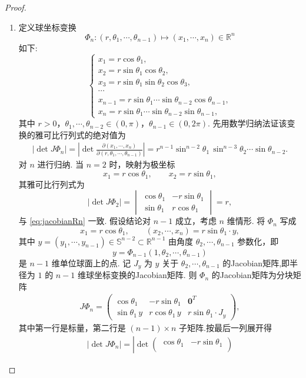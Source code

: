 \documentclass[../../main.tex]{subfiles}%
\begin{document}
\begin{proof}
\begin{enumerate}[(1)]
\item 定义球坐标变换
\[
\Phi_n:(r,\theta_1,\cdots,\theta_{n-1})\mapsto(x_1,\cdots,x_n)\in\mathbb{R}^n
\]
如下:
\[
\begin{cases}
x_1=r\cos\theta_1,\\
x_2=r\sin\theta_1\cos\theta_2,\\
x_3=r\sin\theta_1\sin\theta_2\cos\theta_3,\\
\cdots\\
x_{n-1}=r\sin\theta_1\cdots\sin\theta_{n-2}\cos\theta_{n-1},\\
x_n=r\sin\theta_1\cdots\sin\theta_{n-2}\sin\theta_{n-1},
\end{cases}
\]
其中 $r>0$，$\theta_1,\cdots,\theta_{n-2}\in(0,\pi)$，$\theta_{n-1}\in(0,2\pi)$.
先用数学归纳法证该变换的雅可比行列式的绝对值为
\begin{align}
|\det J\Phi_n|=\left|\det\frac{\partial(x_1,\cdots,x_n)}{\partial(r,\theta_1,\cdots,\theta_{n-1})}\right|
=r^{n-1}\sin^{n-2}\theta_1\,\sin^{n-3}\theta_2\cdots\sin\theta_{n-2}.\label{eq:jacobianRn}
\end{align}
对 $n$ 进行归纳.
当 $n=2$ 时，映射为极坐标
\[
x_1=r\cos\theta_1,\qquad x_2=r\sin\theta_1,
\]
其雅可比行列式为
\[
|\det J\Phi_2|=\begin{vmatrix}
\cos\theta_1 & -r\sin\theta_1\\
\sin\theta_1 & r\cos\theta_1
\end{vmatrix}=r,
\]
与 \eqref{eq:jacobianRn} 一致.
假设结论对 $n-1$ 成立，考虑 $n$ 维情形. 将 $\Phi_n$ 写成
\[
x_1=r\cos\theta_1,\qquad (x_2,\cdots,x_n)=r\sin\theta_1\cdot y,
\]
其中 $y=(y_1,\cdots,y_{n-1})\in\mathbb{S}^{n-2}\subset\mathbb{R}^{n-1}$ 由角度 $\theta_2,\cdots,\theta_{n-1}$ 参数化，即
\[
y=\Phi_{n-1}(1,\theta_2,\cdots,\theta_{n-1})
\]
是 $n-1$ 维单位球面上的点. 记 $J_y$ 为 $y$ 关于 $\theta_2,\cdots,\theta_{n-1}$ 的Jacobian矩阵,即半径为 $1$ 的 $n-1$ 维球坐标变换的Jacobian矩阵. 则 $\Phi_n$ 的Jacobian矩阵为分块矩阵
\begin{align*}
J\Phi_n=
\begin{pmatrix}
\cos\theta_1 & -r\sin\theta_1 & \bm{0}^T \\
\sin\theta_1\, y & r\cos\theta_1\, y & r\sin\theta_1\cdot J_y
\end{pmatrix},
\end{align*}
其中第一行是标量，第二行是 $(n-1)\times n$ 子矩阵.按最后一列展开得
\begin{align*}
|\det J\Phi_n|
=\left|\det\begin{pmatrix}
\cos\theta_1 & -r\sin\theta_1\\

\end{pmatrix}
\end{align*}
\end{enumerate}
\end{proof}
\end{document}
